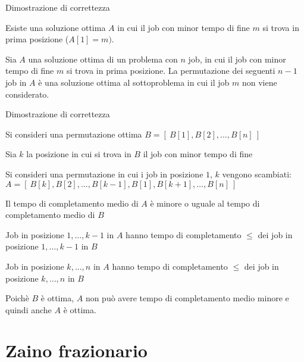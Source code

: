 \begin{frame}{Dimostrazione di correttezza}

Esiste una soluzione ottima $A$ in cui il job con minor tempo di fine $m$ si
trova in prima posizione ($A[1] = m)$.

\bigskip
{}
Sia $A$ una soluzione ottima di un problema con $n$ job, in cui il job
con minor tempo di fine $m$ si trova in prima posizione. La permutazione dei
seguenti $n-1$ job in $A$ è una soluzione ottima al sottoproblema in cui il
job $m$ non viene considerato.

\end{frame}

\begin{frame}{Dimostrazione di correttezza}

\BIL
\item Si consideri una permutazione ottima \alert{$B = [~B[1],B[2], \ldots, B[n]~]$}
\item Sia $k$ la posizione in cui si trova in $B$ il job con minor tempo di fine
\item Si consideri una permutazione in cui i job in posizione $1$, $k$ vengono
scambiati: \alert{$A = [~B[k], B[2], \ldots, B[k-1], B[1], B[k+1], \ldots, B[n]~]$}
\item Il tempo di completamento medio di $A$ è minore o uguale al tempo
di completamento medio di $B$
  \BI
	\item Job in posizione $1, \ldots, k-1$ in $A$ hanno tempo di completamento 
	$\leq$ dei job in posizione $1, \ldots, k-1$ in $B$
	\item Job in posizione $k, \ldots, n$ in $A$ hanno tempo di completamento 
	$\leq$ dei job in posizione $k, \ldots, n$ in $B$
  \EI
\item Poichè $B$ è ottima, $A$ non può avere tempo di completamento medio minore
e quindi anche $A$ è ottima.
\EIL

\end{frame}



\section{Zaino frazionario}

